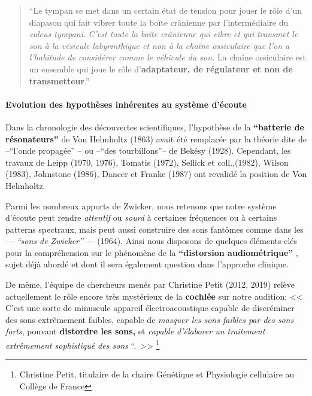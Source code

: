 \begin{quotation}
	``Le tympan se met dans un certain état de tension pour jouer le
	rôle d'un diapason qui fait vibrer toute la boîte crânienne
	par l'intermédiaire du \emph{sulcus tympani}.
	\emph{C'est toute la boîte crânienne qui vibre et qui transmet le son à
la vésicule labyrinthique et non à la chaîne ossiculaire que l'on a l'habitude
de considérer comme le véhicule du son.} La chaîne ossiculaire est un ensemble
qui
	joue le rôle d'\textbf{adaptateur, de régulateur et non de transmetteur}.'' \autocite {tomatis_conf1972}

\end{quotation}


\paragraph{Evolution des hypothèses inhérentes au système d'écoute}



Dans la chronologie des découvertes scientifiques,  l'hypothèse de la \textbf{``batterie de
résonateurs''} de Von Helmholtz (1863)  avait été remplacée par la
théorie dite de  --``l'onde propagée'' -- ou --``des
tourbillons''-- de Bekésy (1928).
Cependant, les travaux de Leipp (1970, 1976), Tomatis (1972), Sellick et coll.,(1982), Wilson (1983),
  Johnstone (1986), Dancer et
  Franke (1987) ont revalidé la position de Von Helmholtz.\autocite[p 24---28,
  ch. 1]{auriol:cle}

  Parmi les nombreux apports de Zwicker, \autocite[p 84]{auriol:cle} nous retenons que notre système d'écoute peut rendre
\textit{attentif} ou\textit{ sourd} à certaines fréquences ou à certains patterns
spectraux, mais peut aussi construire des sons fantômes comme dans les --- \textit{``sons de Zwicker''} --- (1964).
Ainsi nous disposons de quelques éléments-clés pour la compréhension
sur le phénomène de la \textbf{``distorsion audiométrique''} \autocite
{auriol:cle}, sujet déjà abordé et dont il sera également question dans l'approche
clinique.



De même, l'équipe de chercheurs menés par Christine Petit (2012, 2019) relève
actuellement
 le rôle encore très mystérieux de la \textbf{cochlée} sur notre audition:
<<\,C'est une sorte de minuscule appareil électroacoustique capable
de discréminer des sons extrêmement faibles, capable de \emph{masquer
les sons faibles par des sons forts}, pouvant \textbf{distordre les
sons,} et \emph{capable d'élaborer un traitement extrêmement
sophistiqué des sons} ``. \,>> \autocite{petit_lookscience}   \footnote{Christine Petit, titulaire de la chaire Génétique et
Physiologie cellulaire au Collège de France}

